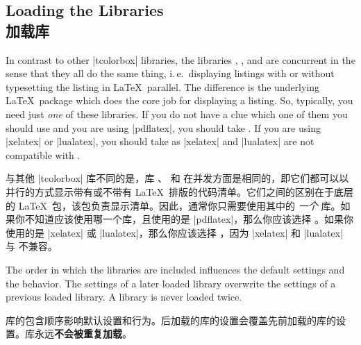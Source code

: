 \subsection{Loading the Libraries\\加载库}

In contrast to other |tcolorbox| libraries, the libraries
, , and  are concurrent in the sense that
they all do the same thing, i.\,e.\ displaying listings with or without typesetting
the listing in \LaTeX\ parallel.
The difference is the underlying \LaTeX\ package which does the core job for
displaying a listing. So, typically, you need just \emph{one} of these
libraries. If you do not have a clue which one of them you should use
and you are using |pdflatex|, you should take .
If you are using |xelatex| or |lualatex|, you should take 
as |xelatex| and |lualatex| are not compatible with .


与其他 |tcolorbox| 库不同的是，库 、 和  在并发方面是相同的，即它们都可以以并行的方式显示带有或不带有 \LaTeX\ 排版的代码清单。它们之间的区别在于底层的 \LaTeX\ 包，该包负责显示清单。因此，通常你只需要使用其中的 \emph{一个} 库。如果你不知道应该使用哪一个库，且使用的是 |pdflatex|，那么你应该选择 。如果你使用的是 |xelatex| 或 |lualatex|，那么你应该选择 ，因为 |xelatex| 和 |lualatex| 与  不兼容。

\begin{marker}
The order in which the libraries are included influences the default settings and
the  behavior. The settings of a later loaded library overwrite
the settings of a previous loaded library. A library is never loaded twice.

库的包含顺序影响默认设置和行为。后加载的库的设置会覆盖先前加载的库的设置。库永远{\bf 不会被重复加载}。
\end{marker}
